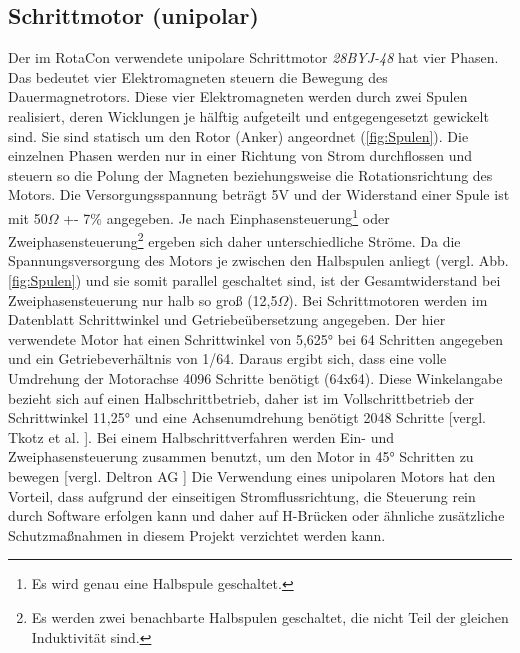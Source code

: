 \documentclass[11pt, titlepage]{report}
\begin{document}
			\subsection*{Schrittmotor (unipolar)}
			\label{sec:Motor}
				Der im RotaCon verwendete unipolare Schrittmotor \textit{28BYJ-48} hat vier Phasen. Das bedeutet vier Elektromagneten steuern die Bewegung des Dauermagnetrotors. Diese vier Elektromagneten werden durch zwei Spulen realisiert, deren Wicklungen je hälftig aufgeteilt und entgegengesetzt gewickelt sind. Sie sind statisch um den Rotor (Anker) angeordnet (\ref{fig:Spulen}). Die einzelnen Phasen werden nur in einer Richtung von Strom durchflossen und steuern so die Polung der Magneten beziehungsweise die Rotationsrichtung des Motors. 
				\newline Die Versorgungsspannung beträgt 5V und der Widerstand einer Spule ist mit 50$\Omega$ +- 7\% angegeben. Je nach Einphasensteuerung\footnote{Es wird genau eine Halbspule geschaltet.} oder Zweiphasensteuerung\footnote{Es werden zwei benachbarte Halbspulen geschaltet, die nicht Teil der gleichen Induktivität sind.} ergeben sich daher unterschiedliche Ströme. Da die Spannungsversorgung des Motors je zwischen den Halbspulen anliegt (vergl. Abb.\ref{fig:Spulen}) und sie somit parallel geschaltet sind, ist der Gesamtwiderstand bei Zweiphasensteuerung nur halb so groß (12,5$\Omega$). 
				\newline Bei Schrittmotoren werden im Datenblatt Schrittwinkel und Getriebeübersetzung angegeben. Der hier verwendete Motor hat einen Schrittwinkel von 5,625° bei 64 Schritten angegeben und ein Getriebeverhältnis von 1/64. Daraus ergibt sich, dass eine volle Umdrehung der Motorachse 4096 Schritte benötigt (64x64). Diese Winkelangabe bezieht sich auf einen Halbschrittbetrieb, daher ist im Vollschrittbetrieb der Schrittwinkel 11,25° und eine Achsenumdrehung benötigt 2048 Schritte [vergl. Tkotz et al. \cite[S.641]{Winkelberechnung}]. Bei einem Halbschrittverfahren werden Ein- und Zweiphasensteuerung zusammen benutzt, um den Motor in 45° Schritten zu bewegen [vergl. Deltron AG \cite[S.7]{Schrittmotor_Steuerung}] 
				\newline Die Verwendung eines unipolaren Motors hat den Vorteil, dass aufgrund der einseitigen Stromflussrichtung, die Steuerung rein durch Software erfolgen kann und daher auf H-Brücken oder ähnliche zusätzliche Schutzmaßnahmen in diesem Projekt verzichtet werden kann.
\end{document}
